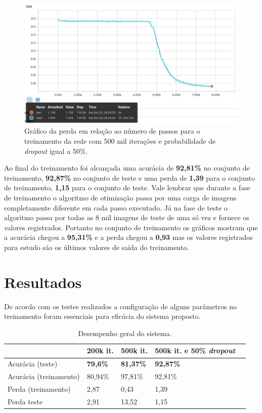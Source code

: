 \begin{figure}[H]
\centering
\includegraphics[scale=0.4]{imagens/loss_500k_dropout50}
\caption{Gráfico da perda em relação ao número de passos para o
  treinamento da rede com 500 mil iterações e probabilidade de
  \textit{dropout} igual a 50\%.}
\label{fig:loss_500k_dropout50}
\end{figure}

Ao final do treinamento foi alcançada uma acurácia de {\bf 92,81\%} no
conjunto de treinamento, {\bf 92,87\%} no conjunto de teste e uma
perda de {\bf 1,39} para o conjunto de treinamento, {\bf 1,15} para o
conjunto de teste. Vale lembrar que durante a fase de treinamento o
algoritmo de otimização passa por uma carga de imagens completamente
diferente em cada passo executado. Já na fase de teste o algoritmo
passa por todas as 8 mil imagens de teste de uma só vez e fornece os
valores registrados. Portanto no conjunto de treinamento os gráficos
mostram que a acurácia chegou a {\bf 95,31\%} e a perda chegou a {\bf
  0,93} mas os valores registrados para estudo são os últimos valores de
saída do treinamento.

\section{Resultados}

De acordo com os testes realizados a configuração de alguns parâmetros
no treinamento foram essenciais para eficácia do sistema proposto.

\begin{table}[H]
\begin{center}
\begin{tabular}{|p{2.3cm}|p{2.3cm}|p{2.3cm}|p{2.3cm}|p{2.3cm}|}
\hline
\textbf{} & \textbf{200k it.} & \textbf{500k it.} & \textbf{500k it. e 50\% \textit{dropout}} \\
\hline
Acurácia (teste) & {\bf 79,6\%} & {\bf 81,37\%} & {\bf 92,87\%} \\
\hline
Acurácia (treinamento) & 80,94\% & 97,81\% & 92,81\% \\
\hline
Perda (treinamento) & 2,87 & 0,43 & 1,39 \\
\hline
Perda teste & 2,91 & 13,52 & 1,15 \\
\hline
\end{tabular}
\caption{Desempenho geral do sistema.}
\label{tab:system_efficency}
\end{center}
\end{table}
